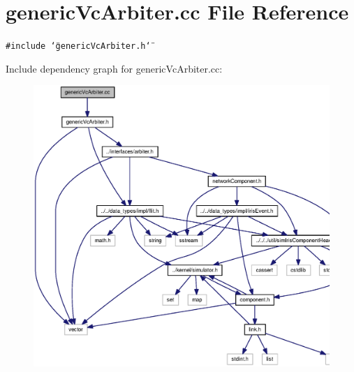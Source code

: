 \section{genericVcArbiter.cc File Reference}
\label{genericVcArbiter_8cc}
{\tt \#include \char`\"{}genericVcArbiter.h\char`\"{}}\par


Include dependency graph for genericVcArbiter.cc:\nopagebreak
\begin{figure}[H]
\begin{center}
\leavevmode
\includegraphics[width=326pt]{genericVcArbiter_8cc__incl}
\end{center}
\end{figure}
